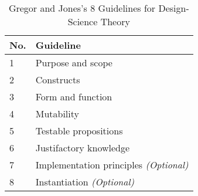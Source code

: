 \begin{table}[ht]
  \begin{center}
    \caption{Gregor and Jones's 8 Guidelines for Design-Science Theory}
    \label{tab:GregorGuidelines}
    \begin{tabular}{l|l} %
      \textbf{No.} & \textbf{Guideline}\\
      \hline
      1 & Purpose and scope\\
      \hline
      2 & Constructs\\
      \hline
      3 & Form and function\\
      \hline
      4 & Mutability\\
      \hline
      5 & Testable propositions\\
      \hline
      6 & Justifactory knowledge\\
      \hline
      7 & Implementation principles \textit{(Optional)}\\
      \hline
      8 & Instantiation \textit{(Optional)}\\
      \hline
    \end{tabular}
  \end{center}
\end{table}